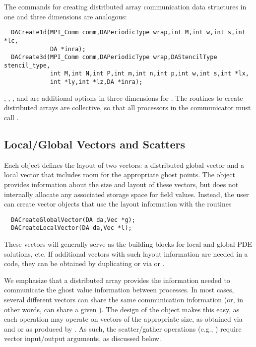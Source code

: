 The commands for creating distributed array communication data structures
in one and three dimensions are analogous:
  
\begin{verbatim}
  DACreate1d(MPI_Comm comm,DAPeriodicType wrap,int M,int w,int s,int *lc,
             DA *inra);
  DACreate3d(MPI_Comm comm,DAPeriodicType wrap,DAStencilType stencil_type,
             int M,int N,int P,int m,int n,int p,int w,int s,int *lx,
             int *ly,int *lz,DA *inra);
\end{verbatim}
, 
, 
, and 
 
are additional options in three dimensions for .
The routines to create distributed arrays are collective, so that all
processors in the communicator  must call .

\subsection{Local/Global Vectors and Scatters}

Each  object defines the layout of two vectors: a distributed
global vector and a local vector that includes room for the
appropriate ghost points.  The  object provides information
about the size and layout of these vectors, but does not internally
allocate any associated storage space for field values.  Instead, the
user can create vector objects that use the  layout
information with the routines
\begin{verbatim}
  DACreateGlobalVector(DA da,Vec *g);
  DACreateLocalVector(DA da,Vec *l);
\end{verbatim}
These vectors will generally serve as the building blocks for local
and global PDE solutions, etc.  If additional vectors with such
layout information are needed in a code, they can be obtained by
duplicating  or  via
 or .

We emphasize that a distributed array provides the information needed
to communicate the ghost value information between processes.  In most
cases, several different vectors can share the same communication
information (or, in other words, can share a given ).  The
design of the  object makes this easy, as each 
operation may operate on vectors of the appropriate size, as obtained
via  and  or as
produced by .  As such, the 
scatter/gather operations (e.g., ) require
vector input/output arguments, as discussed below.

